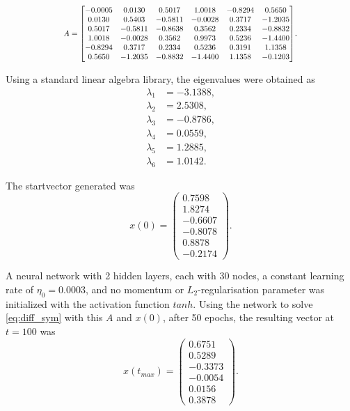 \documentclass[multicolumn, 9pt]{extarticle}
\begin{document}
\newcommand\scalemath[2]{\scalebox{#1}{\mbox{\ensuremath{\displaystyle #2}}}}

\begin{equation*}
	\scalemath{0.8}{
		A = \begin{bmatrix}
			-0.0005 & 0.0130  & 0.5017  & 1.0018  & -0.8294 & 0.5650  \\
			0.0130  & 0.5403  & -0.5811 & -0.0028 & 0.3717  & -1.2035 \\
			0.5017  & -0.5811 & -0.8638 & 0.3562  & 0.2334  & -0.8832 \\
			1.0018  & -0.0028 & 0.3562  & 0.9973  & 0.5236  & -1.4400 \\
			-0.8294 & 0.3717  & 0.2334  & 0.5236  & 0.3191  & 1.1358  \\
			0.5650  & -1.2035 & -0.8832 & -1.4400 & 1.1358  & -0.1203 \\
		\end{bmatrix}}.
\end{equation*}

Using a standard linear algebra library, the eigenvalues were obtained as
\begin{align*}
	\lambda_1 & = -3.1388, \\
	\lambda_2 & = 2.5308,  \\
	\lambda_3 & = -0.8786, \\
	\lambda_4 & = 0.0559,  \\
	\lambda_5 & = 1.2885,  \\
	\lambda_6 & = 1.0142.
\end{align*}

The startvector generated was
\begin{equation*}
	x(0) = \begin{pmatrix}
		0.7598  \\
		1.8274  \\
		-0.6607 \\
		-0.8078 \\
		0.8878  \\
		-0.2174
	\end{pmatrix}.
\end{equation*}

A neural network with 2 hidden layers, each with 30 nodes, a constant learning rate of $\eta_0=0.0003$, and no momentum or $L_2$-regularisation parameter was initialized with the activation function $tanh$. Using the network to solve \eqref{eq:diff_sym} with this $A$ and $x(0)$, after 50 epochs, the resulting vector at $t=100$ was
\begin{equation*}
	x(t_{max}) = \begin{pmatrix}
		0.6751  \\
		0.5289  \\
		-0.3373 \\
		-0.0054 \\
		0.0156  \\
		0.3878
	\end{pmatrix}.
\end{equation*}
\end{document}
